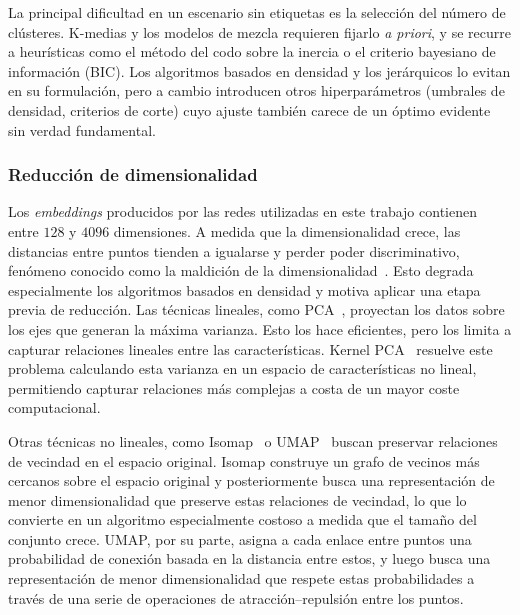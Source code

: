 La principal dificultad en un escenario sin etiquetas es la selección del
número de clústeres. K-medias y los modelos de mezcla requieren fijarlo
\textit{a priori}, y se recurre a heurísticas como el método del codo sobre la
inercia o el criterio bayesiano de información (BIC). Los algoritmos basados en
densidad y los jerárquicos lo evitan en su formulación, pero a cambio
introducen otros hiperparámetros (umbrales de densidad, criterios de corte)
cuyo ajuste también carece de un óptimo evidente sin verdad fundamental.

\subsubsection{Reducción de dimensionalidad}
\label{subsubsec:reduccion}
Los \textit{embeddings} producidos por las redes utilizadas en este trabajo
contienen entre $128$ y $4096$ dimensiones. A medida que la dimensionalidad
crece, las distancias entre puntos tienden a igualarse y perder poder
discriminativo, fenómeno conocido como la maldición de la
dimensionalidad~\cite{aggarwal_surprising_2001}. Esto degrada especialmente los
algoritmos basados en densidad y motiva aplicar una etapa previa de reducción.
Las técnicas lineales, como PCA~\cite{jolliffe_principal_2002}, proyectan los
datos sobre los ejes que generan la máxima varianza. Esto los hace eficientes,
pero los limita a capturar relaciones lineales entre las características.
Kernel PCA~\cite{scholkopf_nonlinear_1998} resuelve este problema calculando
esta varianza en un espacio de características no lineal, permitiendo capturar
relaciones más complejas a costa de un mayor coste computacional.

Otras técnicas no lineales, como Isomap~\cite{tenenbaum_global_2000} o
UMAP~\cite{mcinnes_umap_2020} buscan preservar relaciones de vecindad en el
espacio original. Isomap construye un grafo de vecinos más cercanos sobre el
espacio original y posteriormente busca una representación de menor
dimensionalidad que preserve estas relaciones de vecindad, lo que lo convierte
en un algoritmo especialmente costoso a medida que el tamaño del conjunto
crece. UMAP, por su parte, asigna a cada enlace entre puntos una probabilidad
de conexión basada en la distancia entre estos, y luego busca una
representación de menor dimensionalidad que respete estas probabilidades a
través de una serie de operaciones de atracción--repulsión entre los puntos.

